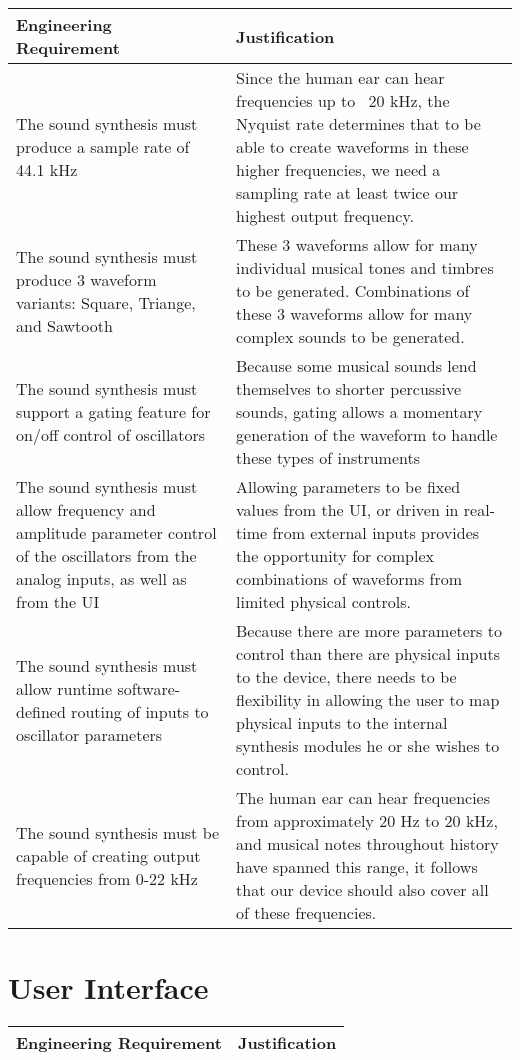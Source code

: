 \documentclass{article}
\begin{document}
\begin{tabular}{|p{3in}|p{3in}|}
\hline
Engineering Requirement & Justification \\
\hline
The sound synthesis must produce a sample rate of 44.1 kHz&
Since the human ear can hear frequencies up to ~20 kHz, the Nyquist rate 
determines that to be able to create waveforms in these higher frequencies, 
we need a sampling rate at least twice our highest output frequency. \\
\hline
The sound synthesis must produce 3 waveform variants: Square, Triange, and Sawtooth&
These 3 waveforms allow for many individual musical tones and timbres to be generated. Combinations of these 3
waveforms allow for many complex sounds to be generated.\\ 
\hline
The sound synthesis must support a gating feature for on/off control of oscillators&
Because some musical sounds lend themselves to shorter percussive sounds, gating allows a momentary
generation of the waveform to handle these types of instruments\\
\hline
The sound synthesis must allow frequency and amplitude parameter control of the oscillators from the 
analog inputs, as well as from the UI&
Allowing parameters to be fixed values from the UI, or driven in real-time from external inputs provides the
opportunity for complex combinations of waveforms from limited physical controls. \\
\hline
The sound synthesis must allow runtime software-defined routing of inputs to oscillator parameters&
Because there are more parameters to control than there are physical inputs to the device, there needs
to be flexibility in allowing the user to map physical inputs to the internal synthesis modules he or she
wishes to control.\\
\hline
The sound synthesis must be capable of creating output frequencies from 0-22 kHz&
The human ear can hear frequencies from approximately 20 Hz to 20 kHz, and musical notes throughout history
have spanned this range, it follows that our device should also cover all of these frequencies.\\
\hline
\end{tabular}

\section{User Interface}

\begin{tabular}{|p{3in}|p{3in}|}
\hline
Engineering Requirement & Justification \\
\hline
\end{tabular}
\end{document}
